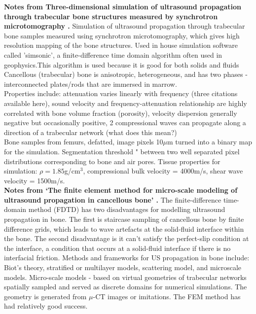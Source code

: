 \documentclass[11pt,titlepage]{article} %
\begin{document}
\textbf{Notes from Three-dimensional simulation of ultrasound propagation through trabecular bone structures measured by synchrotron microtomography \cite{bossy2005three}.}
Simulation of ultrasound propagation through trabecular bone samples measured using synchrotron microtomography, which gives high resolution mapping of the bone structures.
Used in house simulation software called 'simsonic', a finite-difference time domain algorithm often used in geophysics.This algorithm is used because it is good for both solids and fluids \cite{graves1996simulating}\\
Cancellous (trabecular) bone is anisotropic, heterogeneous, and has two phases - interconnected plates/rods that are immersed in marrow. \\
Properties include: attenuation varies linearly with frequency (three citations available here), sound velocity and frequency-attenuation relationship are highly correlated with bone volume fraction (porosity), velocity dispersion generally negative but occasionally positive, 2 compressional waves can propagate along a direction of a trabecular network (what does this mean?)\\
Bone samples from femurs, defatted, image pixels 10$\mu$m turned into a binary map for the simulation. Segmentation threshold " between two well separated pixel distributions corresponding to bone and air pores. Tissue properties for simulation: $\rho = 1.85$g/cm$^3$, compressional bulk velocity = 4000m/s, shear wave velocity = 1500m/s.\\


\textbf{Notes from `The finite element method for micro-scale modeling of ultrasound propagation in cancellous bone' \cite{vafaeian2014finite}. }
The finite-difference time-domain method (FDTD) has two disadvantages for modelling ultrasound propagation in bone. The first is staircase sampling of cancellous bone by finite difference grids, which leads to wave artefacts at the solid-fluid interface within the bone. The second disadvantage is it can't satisfy the perfect-slip condition at the interface, a condition that occurs at a solid-fluid interface if there is no interfacial friction. 
Methods and frameworks for US propagation in bone include: Biot's theory, stratified or multilayer models, scattering model, and microscale models. 
Micro-scale models - based on virtual geometries of trabecular networks spatially sampled and served as discrete domains for numerical simulations. The geometry is generated from $\mu$-CT images or imitations. The FEM method has had relatively good success. 
\end{document}
